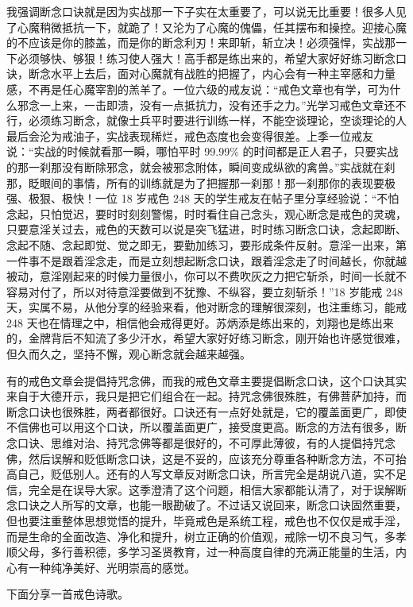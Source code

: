 我强调断念口诀就是因为实战那一下子实在太重要了，可以说无比重要！很多人见了心魔稍微抵抗一下，就跪了！又沦为了心魔的傀儡，任其摆布和操控。迎接心魔的不应该是你的膝盖，而是你的断念利刃！来即斩，斩立决！必须强悍，实战那一下必须够快、够狠！练习使人强大！高手都是练出来的，希望大家好好练习断念口诀，断念水平上去后，面对心魔就有战胜的把握了，内心会有一种主宰感和力量感，不再是任心魔宰割的羔羊了。一位六级的戒友说：“戒色文章也有学，可为什么邪念一上来，一击即溃，没有一点抵抗力，没有还手之力。”光学习戒色文章还不行，必须练习断念，就像士兵平时要进行训练一样，不能空谈理论，空谈理论的人最后会沦为戒油子，实战表现稀烂，戒色态度也会变得很差。上季一位戒友说：“实战的时候就看那一瞬，哪怕平时 99.99\% 的时间都是正人君子，只要实战的那一刹那没有断除邪念，就会被邪念附体，瞬间变成纵欲的禽兽。”实战就在刹那，眨眼间的事情，所有的训练就是为了把握那一刹那！那一刹那你的表现要极强、极狠、极快！一位 18 岁戒色 248 天的学生戒友在帖子里分享经验说：“不怕念起，只怕觉迟，要时时刻刻警惕，时时看住自己念头，观心断念是戒色的灵魂，只要意淫关过去，戒色的天数可以说是突飞猛进，时时练习断念口诀，念起即断、念起不随、念起即觉、觉之即无，要勤加练习，要形成条件反射。意淫一出来，第一件事不是跟着淫念走，而是立刻想起断念口诀，跟着淫念走了时间越长，你就越被动，意淫刚起来的时候力量很小，你可以不费吹灰之力把它斩杀，时间一长就不容易对付了，所以对待意淫要做到不犹豫、不纵容，要立刻斩杀！”18 岁能戒 248 天，实属不易，从他分享的经验来看，他对断念的理解很深刻，也注重练习，能戒 248 天也在情理之中，相信他会戒得更好。苏炳添是练出来的，刘翔也是练出来的，金牌背后不知流了多少汗水，希望大家好好练习断念，刚开始也许感觉很难，但久而久之，坚持不懈，观心断念就会越来越强。

有的戒色文章会提倡持咒念佛，而我的戒色文章主要提倡断念口诀，这个口诀其实来自于大德开示，我只是把它们组合在一起。持咒念佛很殊胜，有佛菩萨加持，而断念口诀也很殊胜，两者都很好。口诀还有一点好处就是，它的覆盖面更广，即使不信佛也可以用这个口诀，所以覆盖面更广，接受度更高。断念的方法有很多，断念口诀、思维对治、持咒念佛等都是很好的，不可厚此薄彼，有的人提倡持咒念佛，然后误解和贬低断念口诀，这是不妥的，应该充分尊重各种断念方法，不可抬高自己，贬低别人。还有的人写文章反对断念口诀，所言完全是胡说八道，实不足信，完全是在误导大家。这季澄清了这个问题，相信大家都能认清了，对于误解断念口诀之人所写的文章，也能一眼勘破了。不过话又说回来，断念口诀固然重要，但也要注重整体思想觉悟的提升，毕竟戒色是系统工程，戒色也不仅仅是戒手淫，而是生命的全面改造、净化和提升，树立正确的价值观，戒除一切不良习气，多孝顺父母，多行善积德，多学习圣贤教育，过一种高度自律的充满正能量的生活，内心有一种纯净美好、光明崇高的感觉。

下面分享一首戒色诗歌。


